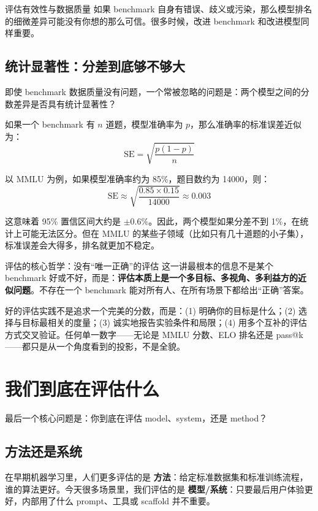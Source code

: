 \documentclass[a4paper]{article}
\begin{document}
\begin{knowledgebox}{评估有效性与数据质量}
如果 benchmark 自身有错误、歧义或污染，那么模型排名的细微差异可能没有你想的那么可信。很多时候，改进 benchmark 和改进模型同样重要。
\end{knowledgebox}

\subsection{统计显著性：分差到底够不够大}

即使 benchmark 数据质量没有问题，一个常被忽略的问题是：两个模型之间的分数差异是否具有统计显著性？

如果一个 benchmark 有 $n$ 道题，模型准确率为 $p$，那么准确率的标准误差近似为：
\[
\mathrm{SE} = \sqrt{\frac{p(1-p)}{n}}
\]

以 MMLU 为例，如果模型准确率约为 85\%，题目数约为 14000，则：
\[
\mathrm{SE} \approx \sqrt{\frac{0.85 \times 0.15}{14000}} \approx 0.003
\]

这意味着 95\% 置信区间大约是 $\pm 0.6\%$。因此，两个模型如果分差不到 1\%，在统计上可能无法区分。但在 MMLU 的某些子领域（比如只有几十道题的小子集），标准误差会大得多，排名就更加不稳定。

\begin{importantbox}{评估的核心哲学：没有``唯一正确''的评估}
这一讲最根本的信息不是某个 benchmark 好或不好，而是：\textbf{评估本质上是一个多目标、多视角、多利益方的近似问题}。不存在一个 benchmark 能对所有人、在所有场景下都给出``正确''答案。

好的评估实践不是追求一个完美的分数，而是：(1) 明确你的目标是什么；(2) 选择与目标最相关的度量；(3) 诚实地报告实验条件和局限；(4) 用多个互补的评估方式交叉验证。任何单一数字——无论是 MMLU 分数、ELO 排名还是 pass@k——都只是从一个角度看到的投影，不是全貌。
\end{importantbox}

\section{我们到底在评估什么}

最后一个核心问题是：你到底在评估 model、system，还是 method？

\subsection{方法还是系统}

在早期机器学习里，人们更多评估的是 \textbf{方法}：给定标准数据集和标准训练流程，谁的算法更好。今天很多场景里，我们评估的是 \textbf{模型/系统}：只要最后用户体验更好，内部用了什么 prompt、工具或 scaffold 并不重要。
\end{document}
